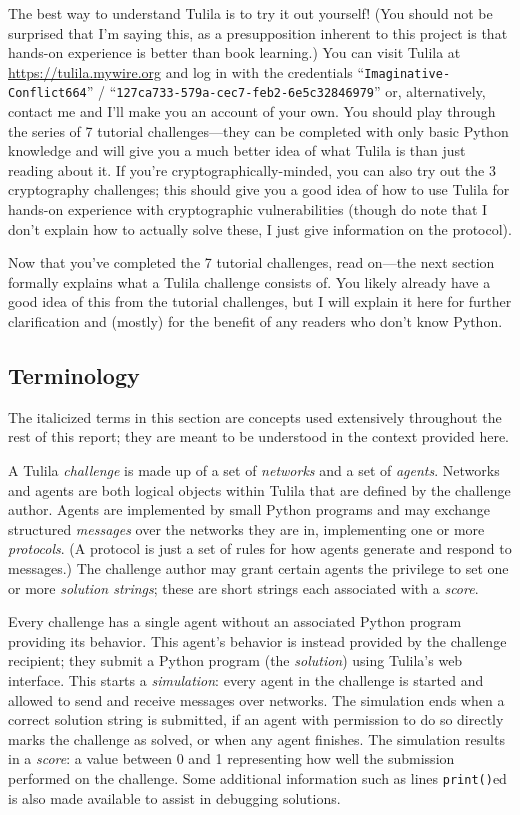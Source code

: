 \documentclass[12pt]{article}
\begin{document}
The best way to understand Tulila is to try it out yourself! (You should not be surprised that I'm saying this, as a presupposition inherent to this project is that hands-on experience is better than book learning.) You can visit Tulila at \url{https://tulila.mywire.org} and log in with the credentials ``\texttt{Imaginative-Conflict664}'' / ``\texttt{127ca733-579a-cec7-feb2-6e5c32846979}'' or, alternatively, contact me and I'll make you an account of your own. You should play through the series of 7 tutorial challenges---they can be completed with only basic Python knowledge and will give you a much better idea of what Tulila is than just reading about it. If you're cryptographically-minded, you can also try out the 3 cryptography challenges; this should give you a good idea of how to use Tulila for hands-on experience with cryptographic vulnerabilities (though do note that I don't explain how to actually solve these, I just give information on the protocol).

Now that you've completed the 7 tutorial challenges, read on---the next section formally explains what a Tulila challenge consists of. You likely already have a good idea of this from the tutorial challenges, but I will explain it here for further clarification and (mostly) for the benefit of any readers who don't know Python.

\subsection{Terminology}

The italicized terms in this section are concepts used extensively throughout the rest of this report; they are meant to be understood in the context provided here.

A Tulila \textit{challenge} is made up of a set of \textit{networks} and a set of \textit{agents}. Networks and agents are both logical objects within Tulila that are defined by the challenge author. Agents are implemented by small Python programs and may exchange structured \textit{messages} over the networks they are in, implementing one or more \textit{protocols}. (A protocol is just a set of rules for how agents generate and respond to messages.) The challenge author may grant certain agents the privilege to set one or more \textit{solution strings}; these are short strings each associated with a \textit{score}.

Every challenge has a single agent without an associated Python program providing its behavior. This agent's behavior is instead provided by the challenge recipient; they submit a Python program (the \textit{solution}) using Tulila's web interface. This starts a \textit{simulation}: every agent in the challenge is started and allowed to send and receive messages over networks. The simulation ends when a correct solution string is submitted, if an agent with permission to do so directly marks the challenge as solved, or when any agent finishes. The simulation results in a \textit{score}: a value between 0 and 1 representing how well the submission performed on the challenge. Some additional information such as lines \texttt{print()}ed is also made available to assist in debugging solutions.
\end{document}
